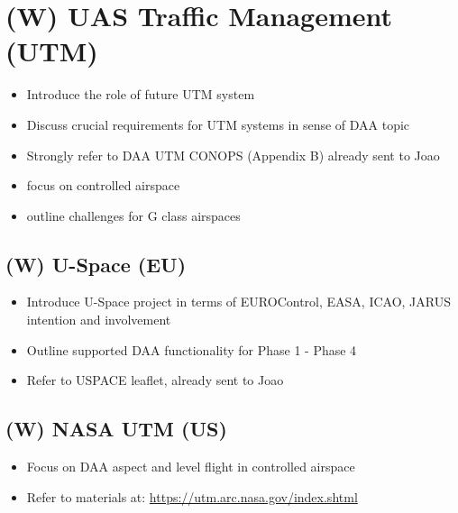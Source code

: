 \section{(W) UAS Traffic Management (UTM)}\label{sec:UTM}
\begin{itemize}
    \item Introduce the role of future UTM system
    \item Discuss crucial requirements for UTM systems in sense of DAA topic
    \item Strongly refer to DAA UTM CONOPS (Appendix B) already sent to Joao
    \item focus on controlled airspace
    \item outline challenges for G class airspaces
\end{itemize}

\subsection{(W) U-Space (EU)}\label{sec:USpace}
\begin{itemize}
    \item Introduce U-Space project in terms of EUROControl, EASA, ICAO, JARUS intention and involvement
    \item Outline supported DAA functionality for Phase 1 - Phase 4
    \item Refer to USPACE leaflet, already sent to Joao
\end{itemize}

\subsection{(W) NASA UTM (US)}\label{sec:NASAUtm}
\begin{itemize}
    \item Focus on DAA aspect and level flight in controlled airspace
    \item Refer to materials at: \url{https://utm.arc.nasa.gov/index.shtml}
\end{itemize}


